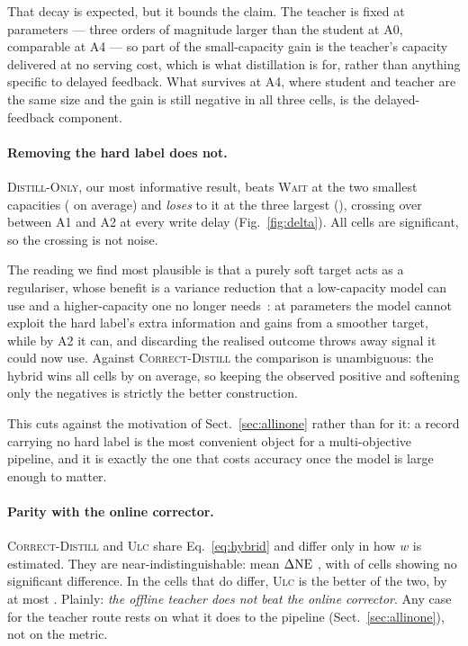 That decay is expected, but it bounds the claim. The teacher is fixed at \teacherParams{}
parameters --- three orders of magnitude larger than the student at A0, comparable at A4 --- so
part of the small-capacity gain is the teacher's capacity delivered at no serving cost, which
is what distillation is for, rather than anything specific to delayed feedback. What survives
at A4, where student and teacher are the same size and the gain is still negative in all three
cells, is the delayed-feedback component.

\paragraph{Removing the hard label does not.}
\textsc{Distill-Only}, our most informative result, beats \textsc{Wait} at the two smallest
capacities (\doWaitSmall{} on average) and \emph{loses}
to it at the three largest (\doWaitLarge{}), crossing over between A1 and A2 at every write
delay (Fig.~\ref{fig:delta}). All \doWaitSig{} cells are significant, so the crossing is not
noise.

The reading we find most plausible is that a purely soft target acts as a regulariser, whose
benefit is a variance reduction that a low-capacity model can use and a higher-capacity one no
longer needs~\cite{menon2021statistical}: at \capMin{} parameters the model cannot exploit the
hard label's extra information and gains from a smoother target, while by A2 it can, and
discarding the realised outcome throws away signal it could now use. Against
\textsc{Correct-Distill} the comparison is unambiguous: the hybrid wins all \cdDoSig{} cells by
\cdDoMean{} on average, so keeping the observed positive and softening only the negatives is
strictly the better construction.

This cuts against the motivation of Sect.~\ref{sec:allinone} rather than for it: a record
carrying no hard label is the most convenient object for a multi-objective pipeline, and it is
exactly the one that costs accuracy once the model is large enough to matter.

\paragraph{Parity with the online corrector.}
\textsc{Correct-Distill} and \textsc{Ulc} share Eq.~\eqref{eq:hybrid} and differ only in how $w$
is estimated. They are near-indistinguishable: mean $\Delta\mathrm{NE}$ \cdUlcMean{}, with \cdUlcNs{} of \cdUlcN{} cells
showing no significant difference. In the \cdUlcSigN{} cells that do differ, \textsc{Ulc} is the
better of the two, by at most \cdUlcSigMax{}. Plainly: \emph{the offline teacher does not beat
the online corrector}. Any case for the teacher route rests on what it does to the pipeline
(Sect.~\ref{sec:allinone}), not on the metric.

